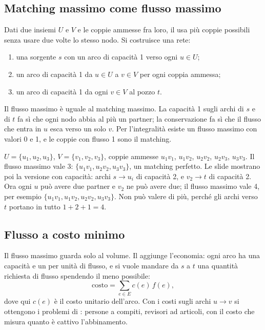 \subsection{Matching massimo come flusso massimo}

Dati due insiemi $U$ e $V$ e le coppie ammesse fra loro, il  usa più coppie possibili senza usare due volte lo stesso nodo. Si costruisce una
rete:
\begin{enumerate}
  \item una sorgente $s$ con un arco di capacità 1 verso ogni $u \in U$;
  \item un arco di capacità 1 da $u \in U$ a $v \in V$ per ogni coppia ammessa;
  \item un arco di capacità 1 da ogni $v \in V$ al pozzo $t$.
\end{enumerate}
Il flusso massimo è uguale al matching massimo. La capacità 1 sugli archi di $s$ e di $t$
fa sì che ogni nodo abbia al più un partner; la conservazione fa sì che il flusso che entra
in $u$ esca verso un solo $v$. Per l'integralità esiste un flusso massimo con valori 0 e 1,
e le coppie con flusso 1 sono il matching.

\begin{esempio}[le slide]
$U = \{u_1, u_2, u_3\}$, $V = \{v_1, v_2, v_3\}$, coppie ammesse $u_1v_1$, $u_1v_2$, $u_2v_2$,
$u_2v_3$, $u_3v_3$. Il flusso massimo vale 3: $\{u_1v_1, u_2v_2, u_3v_3\}$, un matching
perfetto. Le slide mostrano poi la versione con capacità: archi $s \to u_i$ di capacità 2,
e $v_2 \to t$ di capacità 2. Ora ogni $u$ può avere due partner e $v_2$ ne può avere due;
il flusso massimo vale 4, per esempio $\{u_1v_1, u_1v_2, u_2v_2, u_3v_3\}$. Non può valere
di più, perché gli archi verso $t$ portano in tutto $1 + 2 + 1 = 4$.
\end{esempio}

\subsection{Flusso a costo minimo}

Il flusso massimo guarda solo al volume. Il  aggiunge l'economia:
ogni arco ha una capacità e un  per unità di flusso, e si vuole mandare da $s$ a
$t$ una quantità richiesta di flusso spendendo il meno possibile:
\[
  \text{costo} = \sum_{e \in E} c(e)\, f(e),
\]
dove qui $c(e)$ è il costo unitario dell'arco. Con i costi sugli archi $u \to v$ si
ottengono i problemi di : persone a compiti, revisori ad articoli, con il
costo che misura quanto è cattivo l'abbinamento.

